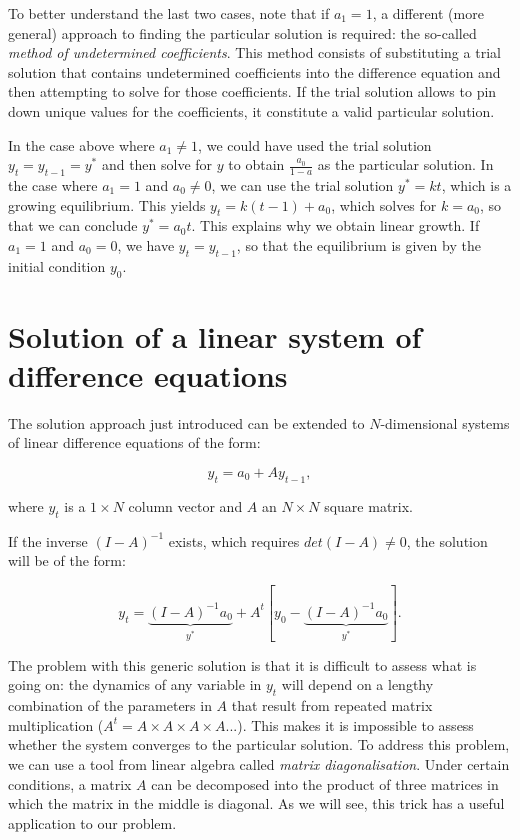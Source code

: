 \documentclass[
  letterpaper,
  DIV=11,
  numbers=noendperiod]{scrreprt}
\begin{document}
To better understand the last two cases, note that if \(a_1=1\), a
different (more general) approach to finding the particular solution is
required: the so-called \emph{method of undetermined coefficients}. This
method consists of substituting a trial solution that contains
undetermined coefficients into the difference equation and then
attempting to solve for those coefficients. If the trial solution allows
to pin down unique values for the coefficients, it constitute a valid
particular solution.

In the case above where \(a_1 \neq 1\), we could have used the trial
solution \(y_t=y_{t-1}=y^*\) and then solve for \(y\) to obtain
\(\frac{a_0}{1-a}\) as the particular solution. In the case where
\(a_1=1\) and \(a_0 \neq 0\), we can use the trial solution \(y^*=kt\),
which is a growing equilibrium. This yields \(y_t = k(t-1) + a_0\),
which solves for \(k=a_0\), so that we can conclude \(y^*=a_0t\). This
explains why we obtain linear growth. If \(a_1=1\) and \(a_0 =0\), we
have \(y_t=y_{t-1}\), so that the equilibrium is given by the initial
condition \(y_0\).

\section{Solution of a linear system of difference
equations}\label{solution-of-a-linear-system-of-difference-equations}

The solution approach just introduced can be extended to
\(N\)-dimensional systems of linear difference equations of the form:

\[
y_t=a_0 + Ay_{t-1},  
\]

where \(y_t\) is a \(1 \times N\) column vector and \(A\) an
\(N \times N\) square matrix.

If the inverse \((I-A)^{-1}\) exists, which requires
\(det(I-A) \neq 0\), the solution will be of the form:

\[
y_t= \underbrace{(I-A)^{-1}a_0}_{y^*} + A^t[y_0- \underbrace{(I-A)^{-1}a_0}_{y^*}].
\]

The problem with this generic solution is that it is difficult to assess
what is going on: the dynamics of any variable in \(y_t\) will depend on
a lengthy combination of the parameters in \(A\) that result from
repeated matrix multiplication (\(A^t=A\times A\times A\times A...\)).
This makes it is impossible to assess whether the system converges to
the particular solution. To address this problem, we can use a tool from
linear algebra called \emph{matrix diagonalisation}. Under certain
conditions, a matrix \(A\) can be decomposed into the product of three
matrices in which the matrix in the middle is diagonal. As we will see,
this trick has a useful application to our problem.
\end{document}
